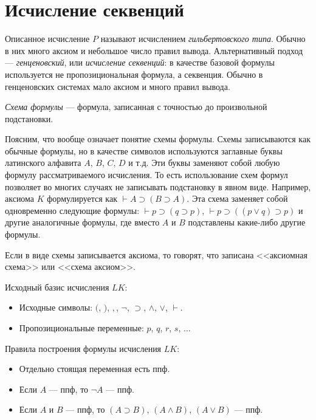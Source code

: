 \section{Исчисление секвенций}

Описанное исчисление $P$ называют исчислением \textit{гильбертовского типа}. Обычно в них много аксиом и небольшое число правил вывода. Альтернативный подход — \textit{генценовский}, или \textit{исчисление секвенций}: в качестве базовой формулы используется не пропозициональная формула, а секвенция. Обычно в генценовских системах мало аксиом и много правил вывода.

\begin{definition}
    \textit{Схема формулы} --- формула, записанная с точностью до произвольной подстановки.
\end{definition}

\begin{remark}
    Поясним, что вообще означает понятие схемы формулы. Схемы записываются как обычные формулы, но в качестве символов используются заглавные буквы латинского алфавита $A$, $B$, $C$, $D$ и т.д. Эти буквы заменяют собой любую формулу рассматриваемого исчисления. То есть использование схем формул позволяет во многих случаях не записывать подстановку в явном виде. Например, аксиома $K$ формулируется как $\vdash A \supset (B \supset A)$. Эта схема заменяет собой одновременно следующие формулы: $\vdash p \supset (q \supset p)$, $\vdash p \supset ((p \lor q) \supset p)$ и другие аналогичные формулы, где вместо $A$ и $B$ подставлены какие-либо другие формулы.

    Если в виде схемы записывается аксиома, то говорят, что записана <<аксиомная схема>> или <<схема аксиом>>.
\end{remark}

Исходный базис исчисления $LK$:
\begin{itemize}
    \item Исходные символы: $($, $)$, $,$, $\lnot$, $\supset$, $\land$, $\lor$, $\vdash$.
    \item Пропозициональные переменные: $p$, $q$, $r$, $s$, $\dots$
\end{itemize}

Правила построения формулы исчисления $LK$:
\begin{itemize}
    \item Отдельно стоящая переменная есть ппф.
    \item Если $A$ --- ппф, то $\lnot A$ --- ппф.
    \item Если $A$ и $B$ --- ппф, то $(A \supset B)$, $(A \land B)$, $(A \lor B)$ --- ппф.
\end{itemize}

